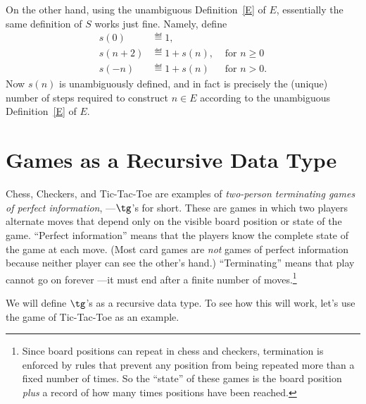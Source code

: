 \begin{definition}
On the other hand, using the unambiguous Definition~\ref{E} of $E$,
essentially the same definition of $S$ works just fine.  Namely, define
\begin{align*}
  s(0) & \eqdef 1,\\
  s(n+2) & \eqdef 1+ s(n), & \text{ for } n \geq 0\\
  s(-n) & \eqdef 1+ s(n) & \text{ for } n > 0.
\end{align*}
Now $s(n)$ is unambiguously defined, and in fact is precisely the (unique)
number of steps required to construct $n \in E$ according to the
unambiguous Definition~\ref{E} of $E$.
\fi


\begin{problems}

\practiceproblems
{}

\classproblems
{}

\homeworkproblems
{}

\end{problems}

\section{Games as a Recursive Data Type}

Chess, Checkers, and Tic-Tac-Toe are examples of \emph{two-person
terminating games of perfect information}, ---$\tg$'s for short.  These
are games in which two players alternate moves that depend only on the
visible board position or state of the game.  ``Perfect information''
means that the players know the complete state of the game at each move.
(Most card games are \emph{not} games of perfect information because
neither player can see the other's hand.)  ``Terminating'' means that play
cannot go on forever ---it must end after a finite number of
moves.\footnote{Since board positions can repeat in chess and checkers,
termination is enforced by rules that prevent any position from being
repeated more than a fixed number of times.  So the ``state'' of these
games is the board position \emph{plus} a record of how many times
positions have been reached.}

We will define $\tg$'s as a 
recursive data type.  To see how this will work, let's use the game of
Tic-Tac-Toe as an example.


\end{definition}
